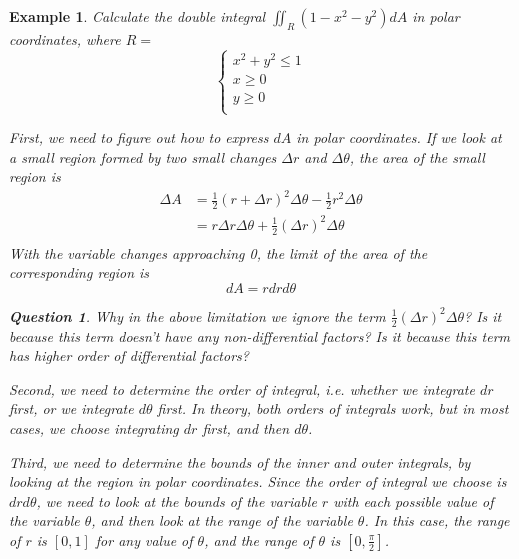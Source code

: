 \documentclass{article}
\newtheorem{example}{Example}
\newtheorem*{question}{Question}
\begin{document}
\begin{example}
  Calculate the double integral $\iint_R (1 - x^2 - y^2) dA$ in polar 
  coordinates, where $R = $
  \begin{equation*}
    \begin{cases}
      x^2 + y^2 \leq 1 \\
      x \geq 0 \\
      y \geq 0 \\  
    \end{cases}
  \end{equation*}

  First, we need to figure out how to express $dA$ in polar coordinates. If we 
  look at a small region formed by two small changes $\Delta r$ and 
  $\Delta \theta$, the area of the small region is
  \begin{equation*}
    \begin{split}
      \Delta A &= \frac{1}{2}(r + \Delta r)^2 \Delta \theta - \frac{1}{2}r^2 \Delta \theta \\
               &= r \Delta r \Delta \theta + \frac{1}{2}(\Delta r)^2 \Delta \theta \\
    \end{split}
  \end{equation*}
  With the variable changes approaching 0, the limit of the area of the corresponding region is
  \begin{equation*}
    dA = r dr d\theta
  \end{equation*}

  \begin{question}
    Why in the above limitation we ignore the term 
    $\frac{1}{2}(\Delta r)^2 \Delta \theta$? Is it because this term doesn't 
    have any non-differential factors? Is it because this term has higher order 
    of differential factors?
  \end{question}

  Second, we need to determine the order of integral, i.e. whether we integrate 
  $dr$ first, or we integrate $d\theta$ first. In theory, both orders of 
  integrals work, but in most cases, we choose integrating $dr$ first, and then 
  $d\theta$.

  Third, we need to determine the bounds of the inner and outer integrals, by 
  looking at the region in polar coordinates. Since the order of integral we 
  choose is $dr d\theta$, we need to look at the bounds of the variable $r$ with 
  each possible value of the variable $\theta$, and then look at the range of 
  the variable $\theta$. In this case, the range of $r$ is $[0, 1]$ for any 
  value of $\theta$, and the range of $\theta$ is $[0, \frac{\pi}{2}]$.


\end{example}
\end{document}
